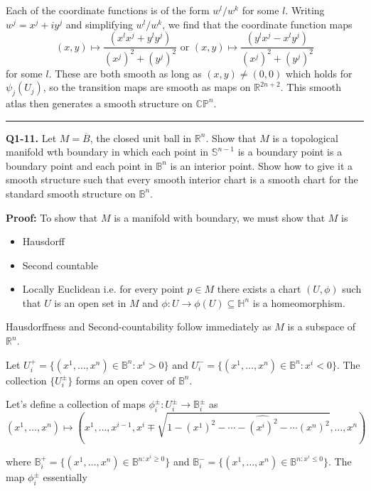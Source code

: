 \documentclass{article}
\newcommand{\R}{\mathbb{R}}
\begin{document}
Each of the coordinate functions is of the form $w^l / w^k$ for some $l$. Writing $w^j = x^j + i y^j$ and simplifying $w^l / w^k$, we find that the coordinate function maps 
\[ (x, y) \mapsto \frac{(x^l x^j + y^l y^j)}{(x^j)^2 + (y^j)^2} \text{ or } (x, y) \mapsto \frac{(y^l x^j - x^l y^j)}{(x^j)^2 + (y^j)^2} \]
for some $l$. These are both smooth as long as $(x, y) \neq (0, 0)$ which holds for $\psi_j(U_j)$, so the transition maps are smooth as maps on $\R^{2n+2}$. This smooth atlas then generates a smooth structure on $\mathbb{CP}^n$.

\vskip 0.5cm
\hrule 
\vskip 0.5cm

\textbf{Q1-11.} Let $M = \overline{B}$, the closed unit ball in $\R^n$. Show that $M$ is a topological manifold wth boundary in which each point in $\mathbb{S}^{n-1}$ is a boundary point is a boundary point and each point in $\mathbb{B}^n$ is an interior point. Show how to give it a smooth structure such that every smooth interior chart is a smooth chart for the standard smooth structure on $\mathbb{B}^n$.

\vskip 0.5cm
\textbf{Proof:}
To show that $M$ is a manifold with boundary, we must show that $M$ is
\begin{itemize}
  \item Hausdorff
  \item Second countable
  \item Locally Euclidean i.e. for every point $p \in M$ there exists a chart $(U, \phi)$ such that $U$ is an open set in $M$ and $\phi : U \rightarrow \phi(U) \subseteq \mathbb{H}^n$ is a homeomorphism. 
\end{itemize}

\vskip 0.25cm
Hausdorffness and Second-countability follow immediately as $M$ is a subspace of $\mathbb{R}^n$.

\vskip 0.25cm
Let $U_i^{+} = \{ (x^1, \dots, x^n) \in \mathbb{B}^n : x^i > 0 \}$ and $U_i^{-} = \{ (x^1, \dots, x^n) \in \mathbb{B}^n : x^i < 0 \}$. The collection $\{ U_i^{\pm} \}$ forms an open cover of $\mathbb{B}^n$.

\vskip 0.25cm
Let's define a collection of maps $\phi_i^{\pm} : U_i^{\pm} \rightarrow \mathbb{B}_i^{\pm}$ as 
\[ (x^1, \dots, x^n) \mapsto \left( x^1, \dots, x^{i-1}, x^i \mp \sqrt{1 - (x^1)^2 - \cdots - \widehat{(x^i)^2} - \cdots (x^n)^2}, \dots, x^n \right) \]

where $\mathbb{B}_i^{+} = \{ (x^1, \dots, x^{n}) \in \mathbb{B}^{n : x^i \geq 0} \}$ and $\mathbb{B}_i^{-} = \{ (x^1, \dots, x^{n}) \in \mathbb{B}^{n : x^i \leq 0} \}$. The map $\phi_i^{\pm}$ essentially 
\end{document}
